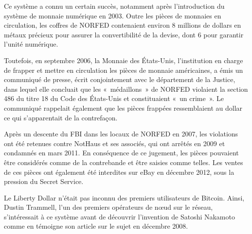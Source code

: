 Ce système a connu un certain succès, notamment après l'introduction du système de monnaie numérique en 2003. Outre les pièces de monnaies en circulation, les coffres de NORFED contenaient environ 8 millions de dollars en métaux précieux pour assurer la convertibilité de la devise, dont 6 pour garantir l'unité numérique.

Toutefois, en septembre 2006, la Monnaie des États-Unis, l'institution en charge de frapper et mettre en circulation les pièces de monnaie américaines, a émis un communiqué de presse, écrit conjointement avec le département de la Justice, dans lequel elle concluait que les «~médaillons~» de NORFED violaient la section 486 du titre 18 du Code des États-Unis et constituaient «~un crime~». Le communiqué rappelait également que les pièces frappées ressemblaient au dollar ce qui s'apparentait de la contrefaçon.

Après un descente du FBI dans les locaux de NORFED en 2007, les violations ont été retenues contre NotHaus et ses associés, qui ont arrêtés en 2009 et condamnés en mars 2011. En conséquence de ce jugement, les pièces pouvaient être considérés comme de la contrebande et être saisies comme telles. Les ventes de ces pièces ont également été interdites sur eBay en décembre 2012, sous la pression du Secret Service.

Le Liberty Dollar n'était pas inconnu des premiers utilisateurs de Bitcoin. Ainsi, Dustin Trammell, l'un des premiers opérateurs de nœud sur le réseau, s'intéressait à ce système avant de découvrir l'invention de Satoshi Nakamoto comme en témoigne son article sur le sujet en décembre 2008.

